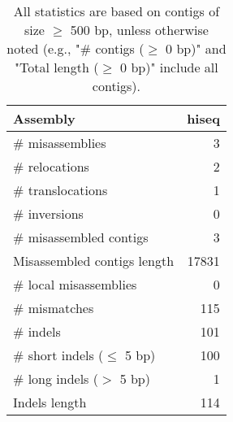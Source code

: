 \documentclass[12pt,a4paper]{article}
\begin{document}
\begin{table}[ht]
\begin{center}
\caption{All statistics are based on contigs of size $\geq$ 500 bp, unless otherwise noted (e.g., "\# contigs ($\geq$ 0 bp)" and "Total length ($\geq$ 0 bp)" include all contigs).}
\begin{tabular}{|l*{1}{|r}|}
\hline
Assembly & hiseq \\ \hline
\# misassemblies & 3 \\ \hline
\hspace{5mm}\# relocations & 2 \\ \hline
\hspace{5mm}\# translocations & 1 \\ \hline
\hspace{5mm}\# inversions & 0 \\ \hline
\# misassembled contigs & 3 \\ \hline
Misassembled contigs length & 17831 \\ \hline
\# local misassemblies & 0 \\ \hline
\# mismatches & 115 \\ \hline
\# indels & 101 \\ \hline
\hspace{5mm}\# short indels ($\leq$ 5 bp) & 100 \\ \hline
\hspace{5mm}\# long indels ($>$ 5 bp) & 1 \\ \hline
Indels length & 114 \\ \hline
\end{tabular}
\end{center}
\end{table}
\end{document}

